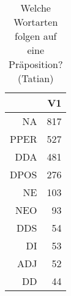 \begin{table}[ht]
\centering
\begin{tabular}{rr}
  \hline
 & V1 \\ 
  \hline
NA & 817 \\ 
  PPER & 527 \\ 
  DDA & 481 \\ 
  DPOS & 276 \\ 
  NE & 103 \\ 
  NEO &  93 \\ 
  DDS &  54 \\ 
  DI &  53 \\ 
  ADJ &  52 \\ 
  DD &  44 \\ 
   \hline
\end{tabular}
\caption{Welche Wortarten folgen auf eine Präposition?  (Tatian)} 
\end{table}
